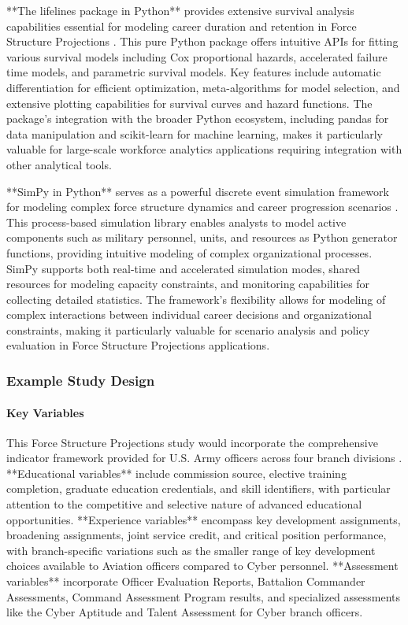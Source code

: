 \documentclass[main.tex]{subfiles}
\begin{document}
**The lifelines package in Python** provides extensive survival analysis capabilities essential for modeling career duration and retention in Force Structure Projections \parencite{lifelines}. This pure Python package offers intuitive APIs for fitting various survival models including Cox proportional hazards, accelerated failure time models, and parametric survival models. Key features include automatic differentiation for efficient optimization, meta-algorithms for model selection, and extensive plotting capabilities for survival curves and hazard functions. The package's integration with the broader Python ecosystem, including pandas for data manipulation and scikit-learn for machine learning, makes it particularly valuable for large-scale workforce analytics applications requiring integration with other analytical tools.

**SimPy in Python** serves as a powerful discrete event simulation framework for modeling complex force structure dynamics and career progression scenarios \parencite{simpy}. This process-based simulation library enables analysts to model active components such as military personnel, units, and resources as Python generator functions, providing intuitive modeling of complex organizational processes. SimPy supports both real-time and accelerated simulation modes, shared resources for modeling capacity constraints, and monitoring capabilities for collecting detailed statistics. The framework's flexibility allows for modeling of complex interactions between individual career decisions and organizational constraints, making it particularly valuable for scenario analysis and policy evaluation in Force Structure Projections applications.

\subsubsection{Example Study Design}

\paragraph{Key Variables}

This Force Structure Projections study would incorporate the comprehensive indicator framework provided for U.S. Army officers across four branch divisions \parencite{army_indicators}. **Educational variables** include commission source, elective training completion, graduate education credentials, and skill identifiers, with particular attention to the competitive and selective nature of advanced educational opportunities. **Experience variables** encompass key development assignments, broadening assignments, joint service credit, and critical position performance, with branch-specific variations such as the smaller range of key development choices available to Aviation officers compared to Cyber personnel. **Assessment variables** incorporate Officer Evaluation Reports, Battalion Commander Assessments, Command Assessment Program results, and specialized assessments like the Cyber Aptitude and Talent Assessment for Cyber branch officers.
\end{document}
